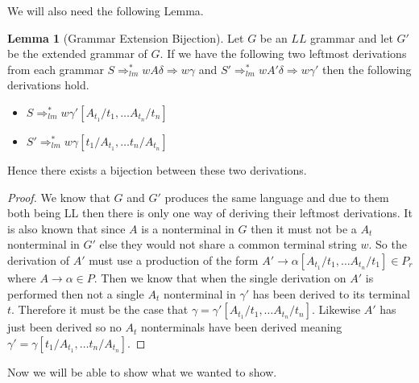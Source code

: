 \documentclass[a4paper,12pt]{article}
\theoremstyle{definition}
\newtheorem{lemma}{Lemma}[section]
\begin{document}
We will also need the following Lemma.
\begin{lemma}[Grammar Extension Bijection]\label{lemma:geb}
  Let $G$ be an $LL$ grammar and let $G'$ be the extended grammar of $G$. If we have the following two leftmost derivations from each grammar $S \Rightarrow_{lm}^* wA\delta \Rightarrow w\gamma$ and $S'\Rightarrow_{lm}^* wA'\delta \Rightarrow w\gamma'$ then the following derivations hold.
  \begin{itemize}
    \item $S \Rightarrow_{lm}^* w\gamma'[A_{t_1}/t_1, \dots A_{t_n}/t_n]$
    \item $S' \Rightarrow_{lm}^* w\gamma[t_1/A_{t_1}, \dots t_n/A_{t_n}]$
  \end{itemize}
  Hence there exists a bijection between these two derivations.
\end{lemma}
\begin{proof}
  We know that $G$ and $G'$ produces the same language and due to them both being LL then there is only one way of deriving their leftmost derivations. It is also known that since $A$ is a nonterminal in $G$ then it must not be a $A_t$ nonterminal in $G'$ else they would not share a common terminal string $w$. So the derivation of $A'$ must use a production of the form $A' \to \alpha[A_{t_1}/t_1, \dots A_{t_n}/t_1] \in P_r$ where $A \to \alpha \in P$. Then we know that when the single derivation on $A'$ is performed then not a single $A_t$ nonterminal in $\gamma'$ has been derived to its terminal $t$. Therefore it must be the case that $\gamma = \gamma'[A_{t_1}/t_1, \dots A_{t_n}/t_n]$. Likewise $A'$ has just been derived so no $A_t$ nonterminals have been derived meaning $\gamma' = \gamma[t_1/A_{t_1}, \dots t_n/A_{t_n}]$.
\end{proof}
\noindent Now we will be able to show what we wanted to show.
\end{document}
